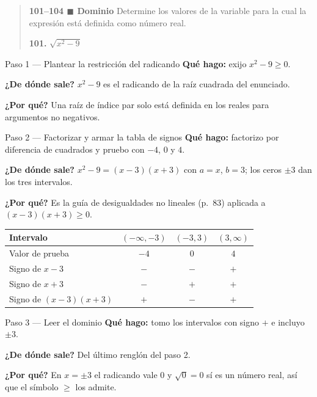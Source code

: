 \documentclass[11pt]{article}
\begin{document}
\begin{quote}
\textbf{101--104 $\blacksquare$ Dominio} \; Determine los valores de la variable para la cual la expresión está definida como número real.

\textbf{101.} $\sqrt{x^2-9}$
\end{quote}

\begin{paso}{Paso 1 --- Plantear la restricción del radicando}
\textbf{Qué hago:} exijo $x^2-9\ge 0$.

\textbf{¿De dónde sale?} $x^2-9$ es el radicando de la raíz cuadrada del enunciado.

\textbf{¿Por qué?} Una raíz de índice par solo está definida en los reales para argumentos no negativos.
\end{paso}

\begin{paso}{Paso 2 --- Factorizar y armar la tabla de signos}
\textbf{Qué hago:} factorizo por diferencia de cuadrados y pruebo con $-4$, $0$ y $4$.

\textbf{¿De dónde sale?} $x^2-9=(x-3)(x+3)$ con $a=x$, $b=3$; los ceros $\pm 3$ dan los tres intervalos.

\textbf{¿Por qué?} Es la guía de desigualdades no lineales (p.~83) aplicada a $(x-3)(x+3)\ge 0$.

\begin{center}
\begin{tabular}{|l|c|c|c|}
\hline
Intervalo & $(-\infty,-3)$ & $(-3,3)$ & $(3,\infty)$ \\
\hline
Valor de prueba & $-4$ & $0$ & $4$ \\
Signo de $x-3$ & $-$ & $-$ & $+$ \\
Signo de $x+3$ & $-$ & $+$ & $+$ \\
\hline
Signo de $(x-3)(x+3)$ & $+$ & $-$ & $+$ \\
\hline
\end{tabular}
\end{center}
\end{paso}

\begin{paso}{Paso 3 --- Leer el dominio}
\textbf{Qué hago:} tomo los intervalos con signo $+$ e incluyo $\pm 3$.

\textbf{¿De dónde sale?} Del último renglón del paso 2.

\textbf{¿Por qué?} En $x=\pm3$ el radicando vale $0$ y $\sqrt{0}=0$ sí es un número real, así que el símbolo $\ge$ los admite.
\end{paso}
\end{document}
